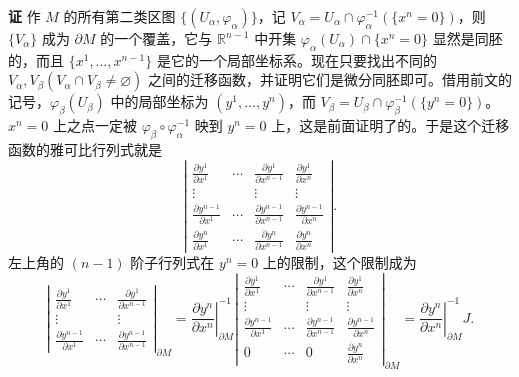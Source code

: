 \noindent\textbf{证}\quad
作 $M$ 的所有第二类区图 $\{(U_\alpha,\varphi_\alpha)\}$，记 $V_\alpha=U_\alpha\cap\varphi_\alpha^{-1}(\{x^n=0\})$，则 $\{V_\alpha\}$ 成为 $\partial M$ 的一个覆盖，它与 $\mathbb R^{n-1}$ 中开集 $\varphi_\alpha(U_\alpha)\cap\{x^n=0\}$ 显然是同胚的，而且 $\{x^1,\ldots,x^{n-1}\}$ 是它的一个局部坐标系。现在只要找出不同的 $V_\alpha,V_\beta(V_\alpha\cap V_\beta\ne\varnothing)$ 之间的迁移函数，并证明它们是微分同胚即可。借用前文的记号，$\varphi_\beta(U_\beta)$ 中的局部坐标为 $(y^1,\ldots,y^n)$，而 $V_\beta=U_\beta\cap\varphi_\beta^{-1}(\{y^n=0\})$。$x^n=0$ 上之点一定被 $\varphi_\beta\circ\varphi_\alpha^{-1}$ 映到 $y^n=0$ 上，这是前面证明了的。于是这个迁移函数的雅可比行列式就是
\[
 \left|
 \begin{array}{cccc}
 \frac{\partial y^1}{\partial x^1}&\cdots&\frac{\partial y^1}{\partial x^{n-1}}&\frac{\partial y^1}{\partial x^n}\\
 \vdots&&\vdots&\vdots\\
 \frac{\partial y^{n-1}}{\partial x^1}&\cdots&\frac{\partial y^{n-1}}{\partial x^{n-1}}&\frac{\partial y^{n-1}}{\partial x^n}\\
 \frac{\partial y^n}{\partial x^1}&\cdots&\frac{\partial y^n}{\partial x^{n-1}}&\frac{\partial y^n}{\partial x^n}
 \end{array}\right|.
\]
左上角的 $(n-1)$ 阶子行列式在 $y^n=0$ 上的限制，这个限制成为
\[
 \left|
 \begin{array}{ccc}
 \frac{\partial y^1}{\partial x^1}&\cdots&\frac{\partial y^1}{\partial x^{n-1}}\\
 \vdots&&\vdots\\
 \frac{\partial y^{n-1}}{\partial x^1}&\cdots&\frac{\partial y^{n-1}}{\partial x^{n-1}}
 \end{array}\right|_{\partial M}
 =\left.\frac{\partial y^n}{\partial x^n}\right|_{\partial M}^{-1}
 \left|
 \begin{array}{cccc}
 \frac{\partial y^1}{\partial x^1}&\cdots&\frac{\partial y^1}{\partial x^{n-1}}&\frac{\partial y^1}{\partial x^n}\\
 \vdots&&\vdots&\vdots\\
 \frac{\partial y^{n-1}}{\partial x^1}&\cdots&\frac{\partial y^{n-1}}{\partial x^{n-1}}&\frac{\partial y^{n-1}}{\partial x^n}\\
 0&\cdots&0&\frac{\partial y^n}{\partial x^n}
 \end{array}\right|_{\partial M}
 =\left.\frac{\partial y^n}{\partial x^n}\right|_{\partial M}^{-1}J.
\]

